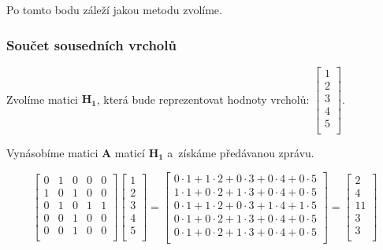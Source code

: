 Po tomto bodu záleží jakou metodu zvolíme.

\subsubsection{Součet sousedních vrcholů}

Zvolíme matici $\mathbf{H_1}$, která bude reprezentovat hodnoty vrcholů:
$\left[ \begin{matrix}
1 \\
2 \\
3 \\
4 \\
5 \\
\end{matrix} \right]$.

Vynásobíme matici $\mathbf{A}$ maticí $\mathbf{H_1}$ a~získáme předávanou zprávu.

$$
\left[ \begin{matrix}
0 & 1 & 0 & 0 & 0 \\
1 & 0 & 1 & 0 & 0 \\
0 & 1 & 0 & 1 & 1 \\
0 & 0 & 1 & 0 & 0 \\
0 & 0 & 1 & 0 & 0 \\
\end{matrix} \right]
\left[ \begin{matrix}
1 \\
2 \\
3 \\
4 \\
5 \\
\end{matrix} \right] = 
\left[ \begin{matrix}
0 \cdot 1 + 1 \cdot 2 + 0 \cdot 3 + 0 \cdot 4 + 0 \cdot 5 \\
1 \cdot 1 + 0 \cdot 2 + 1 \cdot 3 + 0 \cdot 4 + 0 \cdot 5 \\
0 \cdot 1 + 1 \cdot 2 + 0 \cdot 3 + 1 \cdot 4 + 1 \cdot 5 \\
0 \cdot 1 + 0 \cdot 2 + 1 \cdot 3 + 0 \cdot 4 + 0 \cdot 5 \\
0 \cdot 1 + 0 \cdot 2 + 1 \cdot 3 + 0 \cdot 4 + 0 \cdot 5 \\
\end{matrix} \right] = 
\left[ \begin{matrix}
2 \\
4 \\
11 \\
3 \\
3 \\
\end{matrix} \right]
$$

